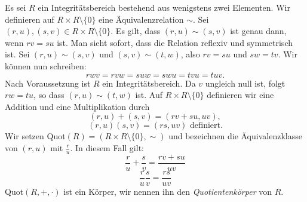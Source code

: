 \begin{satz}\label{quotkoerper} %
Es sei $R$ ein Integritätsbereich bestehend aus wenigstens zwei Elementen. Wir definieren auf $R\times R\setminus\lbrace 0\rbrace$ eine Äquivalenzrelation $\sim$. Sei $\left(r, u\right), \left(s, v\right) \in R\times R\setminus\lbrace 0\rbrace$. Es gilt, dass $\left(r,u\right) \sim \left(s, v\right)$ ist genau dann, wenn $rv = su$ ist. Man sieht sofort, dass die Relation reflexiv und symmetrisch ist. Sei $\left(r,u\right) \sim \left(s, v\right)$ und $ \left(s, v\right) \sim \left(t, w\right) $, also $rv = su$ und $sw = tv$. Wir können nun schreiben: \\
\[rwv = rvw = suw = swu = tvu = tuv.\]
Nach Voraussetzung ist $R$ ein Integritätsbereich. Da $v$ ungleich null ist, folgt $rw = tu$, so dass $\left(r,u \right) \sim \left(t, w\right)$ ist. Auf $R\times R\setminus \lbrace 0\rbrace$ definieren wir eine Addition und eine Multiplikation durch 
\[\left(r,u\right)+ \left(s,v\right) = \left(rv + su, uv\right),\]
\[\left(r,u\right)\left(s,v\right) = \left(rs, uv\right)\text{ definiert.}\] 
Wir setzen \textup{Quot}$(R) = \left(R\times R\setminus\lbrace 0\rbrace , \sim\right)$ und bezeichnen die Äquivalenzklasse von $(r,u) $ mit $\frac{r}{u}$. In diesem Fall gilt: 
\[\frac{r}{u} + \frac{s}{v} = \frac{rv + su}{uv}\]
\[\frac{r}{u}\frac{s}{v} = \frac{rs}{uv}\]
\textup{Quot}$\left(R, +, \cdot\right)$ ist ein Körper, wir nennen ihn den \textit{Quotientenkörper} von $R$.
\end{satz}
